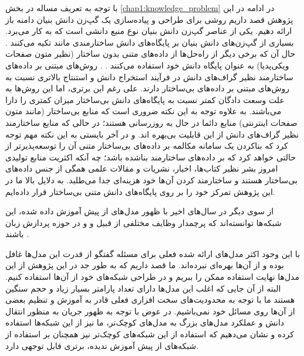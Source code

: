 با توجه به تعریف مساله در بخش 
\ref{chap1:knowledge_problem}
در ادامه  در این پژوهش قصد داریم روشی برای طراحی و پیاده‌سازی یک گپ‌زن دانش بنیان دامنه باز ارائه دهیم. 
یکی از عناصر گپ‌زن دانش بنیان نوع منبع دانشی است که به کار می‌برد. بسیاری از گپ‌زن‌های دانش بنیان بر پایگاه‌های دانش ساختارمندی مانند 
تکیه می‌کنند
\cite{zhou2018commonsense, tuan2019dykgchat}.
حال آن که برخی دیگر از راه‌حل‌ها از داده‌های متنی بدون ساختار (نظیر متون صفحات ویکی‌پدیا) به عنوان پایگاه دانش خود استفاده می‌کنند
\cite{wizard,a_knowledge_grounded,Topical_Chat}.
 . روش‌های مبتنی بر داده‌های ساختارمند نظیر گراف‌های دانش در فرآیند استخراج دانش و استنتاج 
بالاتری نسبت به روش‌های مبتنی بر داده‌های بی‌ساختار دارند.
علی رغم این برتری، اما این روش‌ها به علت وسعت دادگان کمتر نسبت به پایگاه‌های دانش بی‌ساختار میزان
کمتری را دارا می‌باشند.
به علاوه توجه به این نکته ضروری است که منابع بی‌ساختار (مانند متون صفحات اینترنتی) منابع دائما در حال به روزرسانی هستند؛ در حالی که منابع ساختارمند نظیر گراف‌های‌ دانش از این قابلیت بی‌بهره اند. 
و در آخر بایستی به این نکته مهم توجه کرد که بناکردن یک سامانه مکالمه بر داده‌های بی‌ساختار متنی آن را توسعه‌پذیرتر از حالتی خواهد کرد که بر داده‌های ساختارمند بناشده باشد؛ چه آنکه اکثریت منابع تولیدی امروز بشر نظیر کتاب‌ها، اخبار، نشریات و مقالات علمی همگی از جنس‌ داده‌های بی‌ساختار هستند و ساختارمند کردن آن‌ها خود هزینه‌ای جدا می‌طلبد.
به دلایل بالا ما در این پژوهش تمرکز خود را بر روی پایگاه‌های دانش متنی بی‌ساختار قرار داده‌ایم.

از سوی دیگر در سال‌های اخیر با ظهور مدل‌های از پیش آموزش داده شده،
این شبکه‌ها توانسته‌اند که پرچمدار
 وظایف مختلفی از قبیل
و
و
  در حوزه پردازش زبان باشند
\cite{bert, gpt2}.

با این وجود اکثر مدل‌های ارائه شده فعلی برای مسئله گفتگو از قدرت این مدل‌ها غافل بوده و از آن‌ها بهره‌ای نبرده‌اند. ما قصد داریم که به طور جد در این پژوهش از این مدل‌ها نهایت استفاده ممکن را ببریم و در طراحی شبکه‌های خود از آن‌ها استفاده کنیم. البته از آن جایی که اغلب این مدل‌ها دارای تعداد پارامتر بسیار زیاد و حجم سنگین هستند ما با توجه به محدودیت‌های سخت افزاری فعلی قادر به آموزش و تنظیم بعضی از آن‌ها روی مسائل خود نمی‌باشیم. در عوض با توجه به ظهور جریان 
به منظور انتقال دانش و عملکرد مدل‌های بزرگ به مدل‌‌های کوچک‌تر، ما نیز از این شبکه‌ها استفاده کرده و نشان می‌دهیم که استفاده از این شبکه‌های کوچک‌تر نیز همچنان بر استفاده از شبکه‌های از پیش آموزش ندیده، برتری قابل توجهی دارد.

